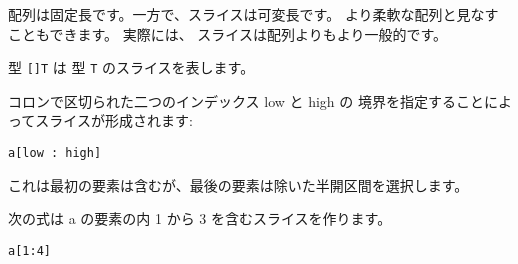 配列は固定長です。一方で、スライスは可変長です。
より柔軟な配列と見なすこともできます。 実際には、
スライスは配列よりもより一般的です。

型 \texttt{[]T} は 型 \texttt{T} のスライスを表します。

コロンで区切られた二つのインデックス low と high の
境界を指定することによってスライスが形成されます:

\begin{lstlisting}[numbers=none]
a[low : high]
\end{lstlisting}

これは最初の要素は含むが、最後の要素は除いた半開区間を選択します。

次の式は a の要素の内 1 から 3 を含むスライスを作ります。

\begin{lstlisting}[numbers=none]
a[1:4]
\end{lstlisting}